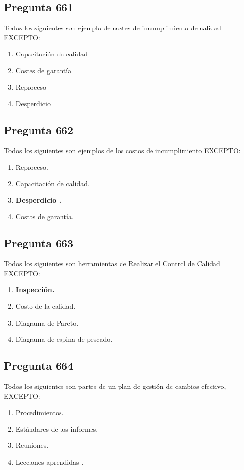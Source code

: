 \documentclass[11pt,a4paper]{article}
\begin{document}
\subsection*{Pregunta 661}
Todos los siguientes son ejemplo de costes de incumplimiento de calidad EXCEPTO:

\begin{enumerate}[label=\alph*)]
  \item Capacitación de calidad
  \item Costes de garantía
  \item Reproceso
  \item Desperdicio
\end{enumerate}

\subsection*{Pregunta 662}
Todos los siguientes son ejemplos de los costos de incumplimiento EXCEPTO:

\begin{enumerate}[label=\alph*)]
  \item Reproceso.
  \item Capacitación de calidad.
  \item \textbf{Desperdicio .}
  \item Costos de garantía.
\end{enumerate}

\subsection*{Pregunta 663}
Todos los siguientes son herramientas de Realizar el Control de Calidad EXCEPTO:

\begin{enumerate}[label=\alph*)]
  \item \textbf{Inspección.}
  \item Costo de la calidad.
  \item Diagrama de Pareto.
  \item Diagrama de espina de pescado.
\end{enumerate}

\subsection*{Pregunta 664}
Todos los siguientes son partes de un plan de gestión de cambios efectivo, EXCEPTO:

\begin{enumerate}[label=\alph*)]
  \item Procedimientos.
  \item Estándares de los informes.
  \item Reuniones.
  \item Lecciones aprendidas .
\end{enumerate}
\end{document}
